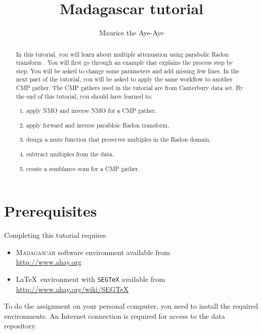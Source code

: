 \author{Maurice the Aye-Aye}
\title{Madagascar tutorial}


\maketitle

\begin{abstract}
  In this tutorial, you will learn about multiple attenuation using parabolic Radon transform \cite[]{hampson86}. You will first go through an example that explains the process step by step. You will be asked to change some parameters and add missing few lines. In the next part of the tutorial, you will be asked to apply the same workflow to another CMP gather. The CMP gathers used in the tutorial are from Canterbury data set. By the end of this tutorial, you should have learned to:
  \begin{enumerate}
    \item apply NMO and inverse NMO for a CMP gather,
    \item apply forward and inverse parabloic Radon transform,
    \item design a mute function that preserves multiples in the Radon domain,
    \item subtract multiples from the data,
    \item create a semblance scan for a CMP gather.
  \end{enumerate}
\end{abstract}

\section{Prerequisites}

Completing this tutorial requires
\begin{itemize}
\item \textsc{Madagascar} software environment available from \\
\url{http://www.ahay.org}
\item \LaTeX\ environment with \texttt{SEGTeX} available from \\ 
\url{http://www.ahay.org/wiki/SEGTeX}
\end{itemize}
To do the assignment on your personal computer, you need to install
the required environments. An Internet connection is required for
access to the data repository.

